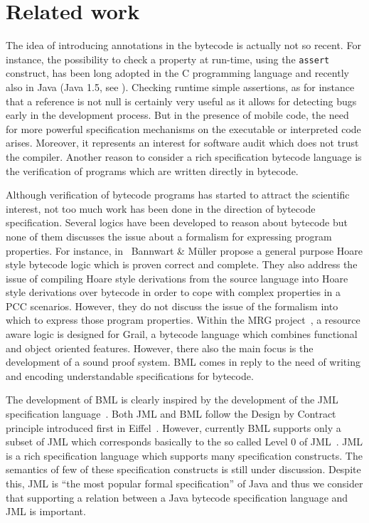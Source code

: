 

\section{Related work}\label{bml:relWork}

The idea of introducing annotations in the bytecode is actually not so recent.  
For instance, the possibility to check a property at run-time, using the \texttt{assert}
 construct, has been long adopted in the C programming language and recently also in Java (Java
1.5, see \cite[\S 14.10]{JLS}). Checking runtime simple assertions,
 as for instance that a reference is not  null is certainly very useful as it
 allows for detecting bugs early in the development process.    
But  in the presence of mobile code, the need for more
 powerful specification mechanisms on the executable or interpreted code arises. Moreover, it  represents an interest  
 for software audit which does not trust the compiler. Another reason to 
 consider a rich specification bytecode language  is the verification of programs which
 are written directly in bytecode. 

Although verification of bytecode programs has started to attract 
the scientific interest,  not too much work has been done in
the direction of bytecode specification. Several logics have been developed to reason about
bytecode but none of them discusses the issue about a formalism for expressing program properties.
For instance, in~\cite{BannwartMueller05} Bannwart \& M\"uller propose a general purpose Hoare style bytecode logic
 which is proven correct and complete. They also address the issue of compiling Hoare style derivations 
from the source language into Hoare style derivations over bytecode in order to cope with complex properties in a PCC scenarios.
 However, they do not discuss the issue of the formalism into which to
 express those program properties. Within the MRG project~\cite{AspinallEtAl:TPHOLs2004}, a resource aware logic is designed for Grail, a bytecode
language which combines functional and object oriented features.  However, there also the main focus is the development of a sound proof system.
 BML comes in reply to the need of  writing  and encoding understandable specifications for
bytecode.

The development of BML is clearly inspired by the development of the
JML specification language~\cite{JMLRefMan}. Both JML and
BML follow the Design by Contract principle introduced first in
Eiffel~\cite{Meyer97}. However, currently BML supports only a subset of JML which corresponds
basically to the so called Level 0 of JML~\cite{JMLRefMan}.
JML is a rich specification language which supports many specification constructs. 
The semantics of few of these specification constructs is still under discussion.
Despite this, JML is ``the most popular formal specification'' of Java and thus 
we consider that supporting a relation between a Java bytecode specification language and JML is important.  

